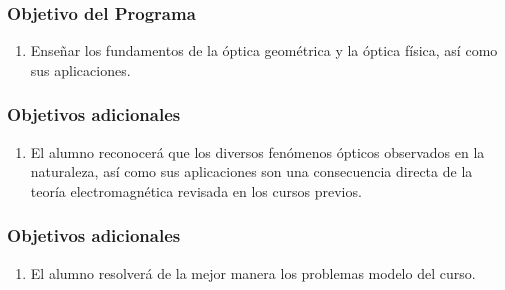 \documentclass[12pt]{beamer}
\begin{document}
\begin{frame}
\frametitle{Objetivo del Programa}
\begin{enumerate}[<+->]
\item  Enseñar los fundamentos de la óptica geométrica y la óptica física, así como sus aplicaciones.
\seti
\end{enumerate}
\end{frame}
\begin{frame}
\frametitle{Objetivos adicionales}    
\begin{enumerate}[<+->]
\conti
\item El alumno reconocerá que los diversos fenómenos ópticos observados en la naturaleza, así como sus aplicaciones son una consecuencia directa de la teoría electromagnética revisada en los cursos previos.
\seti
\end{enumerate}
\end{frame}
\begin{frame}
\frametitle{Objetivos adicionales}
\begin{enumerate}[<+->]
\conti
\item El alumno resolverá de la mejor manera los problemas modelo del curso.
\end{enumerate}
\end{frame}
\end{document}
